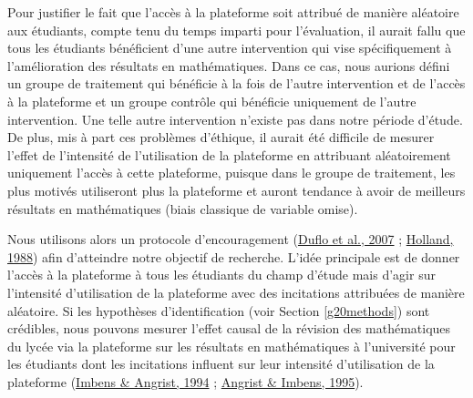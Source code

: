 \documentclass[
]{book}
\begin{document}
Pour justifier le fait que l'accès à la plateforme soit attribué de manière aléatoire aux étudiants, compte tenu du temps imparti pour l'évaluation, il aurait fallu que tous les étudiants bénéficient d'une autre intervention qui vise spécifiquement à l'amélioration des résultats en mathématiques. Dans ce cas, nous aurions défini un groupe de traitement qui bénéficie à la fois de l'autre intervention et de l'accès à la plateforme et un groupe contrôle qui bénéficie uniquement de l'autre intervention. Une telle autre intervention n'existe pas dans notre période d'étude.\\
De plus, mis à part ces problèmes d'éthique, il aurait été difficile de mesurer l'effet de l'intensité de l'utilisation de la plateforme en attribuant aléatoirement uniquement l'accès à cette plateforme, puisque dans le groupe de traitement, les plus motivés utiliseront plus la plateforme et auront tendance à avoir de meilleurs résultats en mathématiques (biais classique de variable omise).

\quad Nous utilisons alors un protocole d'encouragement (\protect\hyperlink{ref-DUF:eal:07}{Duflo et al., 2007} ; \protect\hyperlink{ref-HOL:88}{Holland, 1988}) afin d'atteindre notre objectif de recherche. L'idée principale est de donner l'accès à la plateforme à tous les étudiants du champ d'étude mais d'agir sur l'intensité d'utilisation de la plateforme avec des incitations attribuées de manière aléatoire. Si les hypothèses d'identification (voir Section \ref{g20methods}) sont crédibles, nous pouvons mesurer l'effet causal de la révision des mathématiques du lycée via la plateforme sur les résultats en mathématiques à l'université pour les étudiants dont les incitations influent sur leur intensité d'utilisation de la plateforme (\protect\hyperlink{ref-IMB:ANG:94}{Imbens \& Angrist, 1994} ; \protect\hyperlink{ref-ANG:IMB:95}{Angrist \& Imbens, 1995}).
\end{document}
